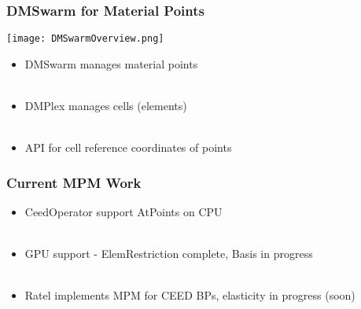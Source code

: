 \documentclass{beamer}
\begin{document}

\begin{frame}
\begin{center}
\frametitle{DMSwarm for Material Points}

\begin{center}
\texttt{[image: DMSwarmOverview.png]}
\end{center}

\begin{itemize}

\item DMSwarm manages material points\\

~\\

\item DMPlex manages cells (elements)\\

~\\

\item API for cell reference coordinates of points\\

\end{itemize}

\end{center}
\end{frame}


\begin{frame}
\begin{center}
\frametitle{Current MPM Work}

\begin{itemize}

\item CeedOperator support AtPoints on CPU\\

~\\

\item GPU support - ElemRestriction complete, Basis in progress\\

~\\

\item Ratel implements MPM for CEED BPs, elasticity in progress (soon)\\

\end{itemize}

\end{center}
\end{frame}
\end{document}
